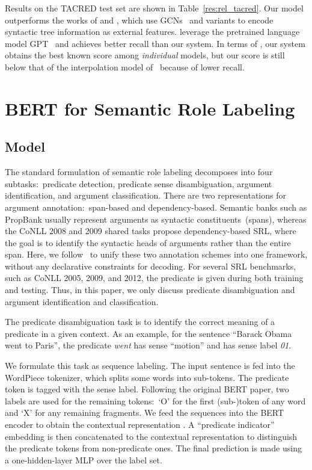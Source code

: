 \documentclass[11pt,a4paper]{article}
\begin{document}
Results on the TACRED test set are shown in Table~\ref{res:rel_tacred}. 
Our model outperforms the works of \citet{zhang2018graph} and \citet{wu2019simplifying}, which use GCNs~\cite{kipf2016semi} and variants to encode syntactic tree information as external features. 
\citet{alt2018improving} leverage the pretrained language model GPT~\cite{radford2018improving} and achieves better recall than our system. 
In terms of , our system obtains the best known score among {\it individual} models, but our score is still below that of the interpolation model of~\citet{zhang2018graph} because of lower recall. 

\section{BERT for Semantic Role Labeling}


\subsection{Model}

The standard formulation of semantic role labeling decomposes into four subtasks:\ predicate detection, predicate sense disambiguation, argument identification, and argument classification. 
There are two representations for argument annotation:\ span-based and dependency-based. 
Semantic banks such as PropBank usually represent arguments as syntactic constituents~(spans), whereas the CoNLL 2008 and 2009 shared tasks propose dependency-based SRL, where the goal is to identify the syntactic heads of arguments rather than the entire span. 
Here, we follow~\citet{li2019dependency} to unify these two annotation schemes into one framework, without any declarative constraints for decoding. 
For several SRL benchmarks, such as CoNLL 2005, 2009, and 2012, the predicate is given during both training and testing. 
Thus, in this paper, we only discuss predicate disambiguation and argument identification and classification.

\smallskip {}
The predicate disambiguation task is to identify the correct meaning of a predicate in a given context. 
As an example, for the sentence ``Barack Obama went to Paris'', the predicate \textit{went} has sense ``motion'' and has sense label \textit{01}.

We formulate this task as sequence labeling.
The input sentence is fed into the WordPiece tokenizer, which splits some words into sub-tokens.
The predicate token is tagged with the sense label.
Following the original BERT paper, two labels are used for the remaining tokens:\ `O' for the first (sub-)token of any word and `X' for any remaining fragments. 
We feed the sequences into the BERT encoder to obtain the contextual representation . 
A ``predicate indicator'' embedding is then concatenated to the contextual representation to distinguish the predicate tokens from non-predicate ones. 
The final prediction is made using a one-hidden-layer MLP over the label set.
\end{document}
